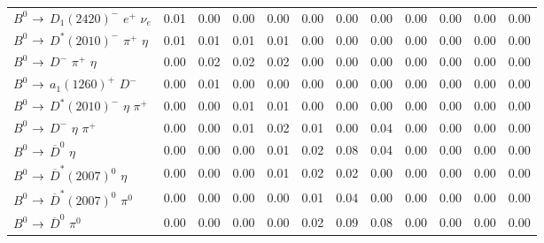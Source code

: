 {\begin{tabular}{lrrrrrrrrrrr}
$B^{0}$ $\rightarrow$ $D_{1}(2420)^{-}$ $e^{+}$ $\nu_{e}$       &         0.01 &         0.00 &         0.00 &         0.00 &         0.00 &         0.00 &         0.00 &         0.00 &         0.00 &         0.00 &         0.00 \\
$B^{0}$ $\rightarrow$ $D^{*}(2010)^{-}$ $\pi^{+}$ $\eta$        &         0.01 &         0.01 &         0.01 &         0.01 &         0.00 &         0.00 &         0.00 &         0.00 &         0.00 &         0.00 &         0.00 \\
$B^{0}$ $\rightarrow$ $D^{-}$ $\pi^{+}$ $\eta$                  &         0.00 &         0.02 &         0.02 &         0.02 &         0.00 &         0.00 &         0.00 &         0.00 &         0.00 &         0.00 &         0.00 \\
$B^{0}$ $\rightarrow$ $a_{1}(1260)^{+}$ $D^{-}$                 &         0.00 &         0.01 &         0.00 &         0.00 &         0.00 &         0.00 &         0.00 &         0.00 &         0.00 &         0.00 &         0.00 \\
$B^{0}$ $\rightarrow$ $D^{*}(2010)^{-}$ $\eta$ $\pi^{+}$        &         0.00 &         0.00 &         0.01 &         0.01 &         0.00 &         0.00 &         0.00 &         0.00 &         0.00 &         0.00 &         0.00 \\
$B^{0}$ $\rightarrow$ $D^{-}$ $\eta$ $\pi^{+}$                  &         0.00 &         0.00 &         0.01 &         0.02 &         0.01 &         0.00 &         0.04 &         0.00 &         0.00 &         0.00 &         0.00 \\
$B^{0}$ $\rightarrow$ $\overline{D}^{0}$ $\eta$                 &         0.00 &         0.00 &         0.00 &         0.01 &         0.02 &         0.08 &         0.04 &         0.00 &         0.00 &         0.00 &         0.00 \\
$B^{0}$ $\rightarrow$ $\overline{D}^{*}(2007)^{0}$ $\eta$       &         0.00 &         0.00 &         0.00 &         0.01 &         0.02 &         0.02 &         0.00 &         0.00 &         0.00 &         0.00 &         0.00 \\
$B^{0}$ $\rightarrow$ $\overline{D}^{*}(2007)^{0}$ $\pi^{0}$    &         0.00 &         0.00 &         0.00 &         0.00 &         0.01 &         0.04 &         0.00 &         0.00 &         0.00 &         0.00 &         0.00 \\
$B^{0}$ $\rightarrow$ $\overline{D}^{0}$ $\pi^{0}$              &         0.00 &         0.00 &         0.00 &         0.00 &         0.02 &         0.09 &         0.08 &         0.00 &         0.00 &         0.00 &         0.00 \\

\end{tabular}}
